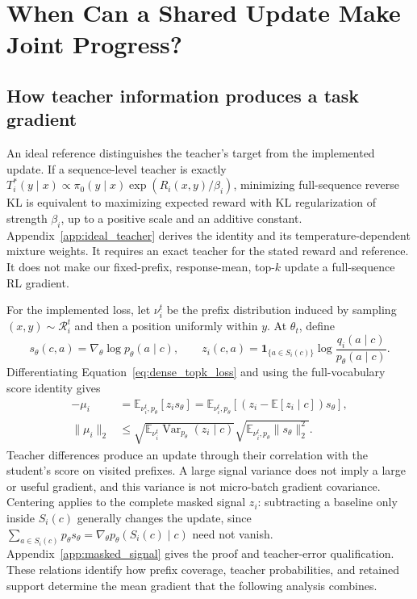 \section{When Can a Shared Update Make Joint Progress?}
\label{sec:theory}

\subsection{How teacher information produces a task gradient}
\label{sec:teacher_signal}

An ideal reference distinguishes the teacher's target from the implemented
update. If a sequence-level teacher is exactly
$T_i^*(y\mid x)\propto\pi_0(y\mid x)\exp(R_i(x,y)/\beta_i)$,
minimizing full-sequence reverse KL is equivalent to maximizing expected
reward with KL regularization of strength $\beta_i$, up to a positive
scale and an additive constant. Appendix~\ref{app:ideal_teacher} derives
the identity and its temperature-dependent mixture weights. It requires
an exact teacher for the stated reward and reference. It does not make
our fixed-prefix, response-mean, top-$k$ update a full-sequence RL gradient.

For the implemented loss, let $\nu_i^t$ be the prefix distribution induced
by sampling $(x,y)\sim\mathcal R_i^t$ and then a position uniformly within
$y$. At $\theta_t$, define
\begin{equation}
    s_\theta(c,a)=\nabla_\theta\log p_\theta(a\mid c),\qquad
    z_i(c,a)=\mathbf1_{\{a\in S_i(c)\}}
                   \log\frac{q_i(a\mid c)}{p_\theta(a\mid c)}.
    \label{eq:masked_teacher_signal}
\end{equation}
Differentiating Equation~\ref{eq:dense_topk_loss} and using the
full-vocabulary score identity gives
\begin{equation}
\begin{split}
    -\mu_i
      &=\mathbb E_{\nu_i^t,p_\theta}[z_i s_\theta]
       =\mathbb E_{\nu_i^t,p_\theta}
          [(z_i-\mathbb E[z_i\mid c])s_\theta],\\
    \|\mu_i\|_2
      &\leq\sqrt{\mathbb E_{\nu_i^t}\operatorname{Var}_{p_\theta}
                      (z_i\mid c)}
             \sqrt{\mathbb E_{\nu_i^t,p_\theta}\|s_\theta\|_2^2}.
\end{split}
\label{eq:teacher_signal_projection}
\end{equation}
Teacher differences produce an update through their correlation with the
student's score on visited prefixes. A large signal variance does not
imply a large or useful gradient, and this variance is not micro-batch
gradient covariance. Centering applies to the complete masked signal $z_i$:
subtracting a baseline only inside $S_i(c)$ generally changes the update,
since $\sum_{a\in S_i(c)}p_\theta s_\theta=
\nabla_\theta p_\theta(S_i(c)\mid c)$ need not vanish.
Appendix~\ref{app:masked_signal} gives the proof and teacher-error
qualification. These relations identify how prefix coverage, teacher
probabilities, and retained support determine the mean gradient that
the following analysis combines.


